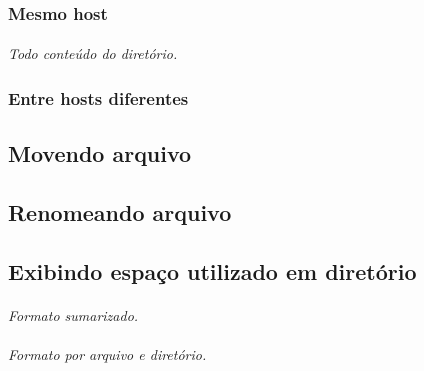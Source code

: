 \documentclass[a4paper,9pt]{extarticle}
\begin{document}
\begin{multicols}{2}
\subsubsection{Mesmo host}
	
	\paragraph{}
	
	
	\paragraph{} \emph{Todo conteúdo do diretório.} 
	
\subsubsection{Entre hosts diferentes}
	

\subsection{Movendo arquivo} 


\subsection{Renomeando arquivo}

 	

\subsection{Exibindo espaço utilizado em diretório}
	
	\paragraph{} \emph{Formato sumarizado.}
	\paragraph{} \emph{Formato por arquivo e diretório.}
	

\end{multicols}
\end{document}
